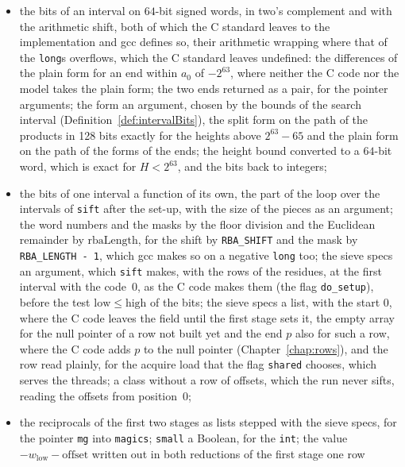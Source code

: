 \begin{itemize}
    list of the length of the first two stages, for the array of $\mathrm{sp3\_max}$ entries, and
    the array of the offsets an argument, which the C code reaches through the pointer of the class;
  \item the bits of an interval on $64$-bit signed words, in two's complement and with the
    arithmetic shift, both of which the C standard leaves to the implementation and gcc defines so,
    their arithmetic wrapping where that of the \verb|long|s overflows, which the C standard leaves
    undefined: the differences of the plain form for an end within $a_0$ of $-2^{63}$, where neither
    the C code nor the model takes the plain form; the two ends returned as a pair, for the pointer
    arguments; the form an argument, chosen by the bounds of the search interval
    (Definition~\ref{def:intervalBits}), the split form on the path of the products in 128 bits
    exactly for the heights above $2^{63} - 65$ and the plain form on the path of the forms of the
    ends; the height bound converted to a $64$-bit word, which is exact for $H < 2^{63}$, and the
    bits back to integers;
  \item the bits of one interval a function of its own, the part of the loop over the intervals of
    \verb|sift| after the set-up, with the size of the pieces as an argument; the word numbers and
    the masks by the floor division and the Euclidean remainder by $\mathrm{rbaLength}$, for the
    shift by \verb|RBA_SHIFT| and the mask by \verb|RBA_LENGTH - 1|, which gcc makes so on a
    negative \verb|long| too; the sieve specs an argument, which \verb|sift| makes, with the rows of
    the residues, at the first interval with the code~$0$, as the C code makes them (the flag
    \verb|do_setup|), before the test $\mathrm{low} \le \mathrm{high}$ of the bits; the sieve specs
    a list, with the start $0$, where the C code leaves the field until the first stage sets it, the
    empty array for the null pointer of a row not built yet and the end $p$ also for such a row,
    where the C code adds $p$ to the null pointer (Chapter~\ref{chap:rows}), and the row read
    plainly, for the acquire load that the flag \verb|shared| chooses, which serves the threads; a
    class without a row of offsets, which the run never sifts, reading the offsets from
    position~$0$;
  \item the reciprocals of the first two stages as lists stepped with the sieve specs, for the
    pointer \verb|mg| into \verb|magics|; \verb|small| a Boolean, for the \verb|int|; the value
    $-w_{\mathrm{low}} - \mathrm{offset}$ written out in both reductions of the first stage one row

\end{itemize}
